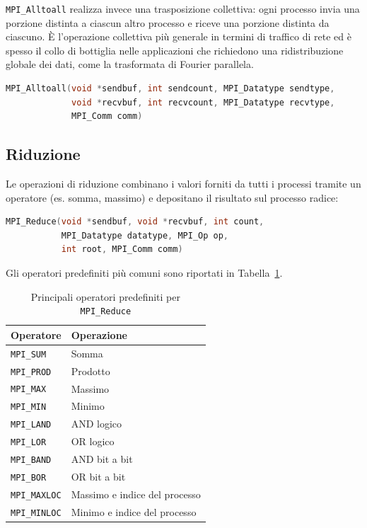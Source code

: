 \texttt{MPI\_Alltoall} realizza invece una trasposizione collettiva: ogni processo invia una porzione distinta a ciascun altro processo e riceve una porzione distinta da ciascuno. È l'operazione collettiva più generale in termini di traffico di rete ed è spesso il collo di bottiglia nelle applicazioni che richiedono una ridistribuzione globale dei dati, come la trasformata di Fourier parallela.
\begin{lstlisting}[language=C, numbers=none]
MPI_Alltoall(void *sendbuf, int sendcount, MPI_Datatype sendtype,
             void *recvbuf, int recvcount, MPI_Datatype recvtype,
             MPI_Comm comm)
\end{lstlisting}

\subsection{Riduzione}
Le operazioni di riduzione combinano i valori forniti da tutti i processi tramite un operatore (es. somma, massimo) e depositano il risultato sul processo radice:
\begin{lstlisting}[language=C, numbers=none]
MPI_Reduce(void *sendbuf, void *recvbuf, int count,
           MPI_Datatype datatype, MPI_Op op,
           int root, MPI_Comm comm)
\end{lstlisting}
Gli operatori predefiniti più comuni sono riportati in Tabella~\ref{tab:mpi_op}.

\begin{table}[h!]
\centering
\caption{Principali operatori predefiniti per \texttt{MPI\_Reduce}}
\label{tab:mpi_op}
\begin{tabular}{ll}
\toprule
Operatore & Operazione \\
\midrule
\texttt{MPI\_SUM}    & Somma \\
\texttt{MPI\_PROD}   & Prodotto \\
\texttt{MPI\_MAX}    & Massimo \\
\texttt{MPI\_MIN}    & Minimo \\
\texttt{MPI\_LAND}   & AND logico \\
\texttt{MPI\_LOR}    & OR logico \\
\texttt{MPI\_BAND}   & AND bit a bit \\
\texttt{MPI\_BOR}    & OR bit a bit \\
\texttt{MPI\_MAXLOC} & Massimo e indice del processo \\
\texttt{MPI\_MINLOC} & Minimo e indice del processo \\
\bottomrule
\end{tabular}
\end{table}


